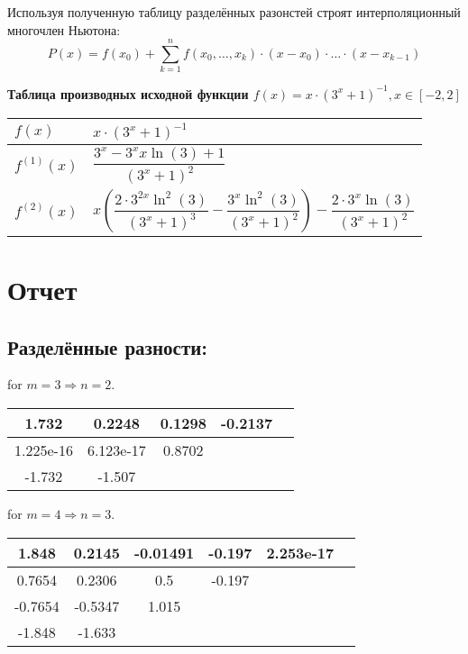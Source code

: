 \documentclass{article}
\begin{document}
Используя полученную таблицу разделённых разонстей строят интерполяционный многочлен Ньютона:
\begin{equation}
    \label{eq:newton}
    P(x) = f(x_0)+\sum\limits_{k=1}^n f(x_0, \ldots, x_k) \cdot (x-x_0) \cdot \ldots \cdot (x-x_{k-1})
\end{equation}

\textbf{Таблица производных исходной функции $f(x) = x \cdot (3^x + 1)^{-1}, x \in [-2, 2]$}
\begin{center}
	\begin{tabular}{| l | l |}
	\hline
	$f(x)$ & $x \cdot (3^x + 1)^{-1}$ \\ \hline
	$f^{(1)}(x)$ & $\dfrac{3^x-3^x x \ln (3)+1}{\left(3^x+1\right)^2}$ \\ \hline
	$f^{(2)}(x)$ & $x \left(\dfrac{2 \cdot 3^{2x} \ln^2(3)}{(3^x+1)^3}-\dfrac{3^x \ln^2(3)}{(3^x+1)^2}\right) - \dfrac{2 \cdot 3^x \ln(3)}{(3^x+1)^2}$ \\ \hline
	\end{tabular}
\end{center}

\section{Отчет}
\subsection{Разделённые разности:}
for $ m = 3 \Rightarrow n = 2 $.
\begin{center}
\begin{tabular}{|c|c|c|c|c|}
\hline
1.732 &0.2248 &0.1298 &-0.2137\\\hline 
1.225e-16 &6.123e-17 &0.8702 &\\\hline 
-1.732 &-1.507 & &\\\hline 
\end{tabular}
\end{center}

for $ m = 4 \Rightarrow n = 3 $.
\begin{center}
\begin{tabular}{|c|c|c|c|c|c|}
\hline
1.848 &0.2145 &-0.01491 &-0.197 &2.253e-17\\\hline 
0.7654 &0.2306 &0.5 &-0.197 &\\\hline 
-0.7654 &-0.5347 &1.015 & &\\\hline 
-1.848 &-1.633 & & &\\\hline 
\end{tabular}
\end{center}
\end{document}
